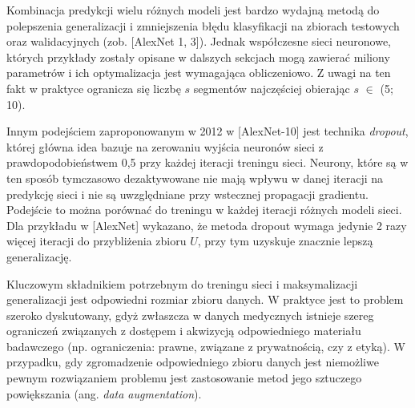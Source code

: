 Kombinacja predykcji wielu różnych modeli jest bardzo wydajną metodą do polepszenia generalizacji i zmniejszenia błędu klasyfikacji na zbiorach testowych oraz walidacyjnych (zob. [AlexNet 1, 3]). Jednak współczesne sieci neuronowe, których przykłady zostały opisane w dalszych sekcjach mogą zawierać miliony parametrów i ich optymalizacja jest wymagająca obliczeniowo. Z uwagi na ten fakt w praktyce ogranicza się liczbę $s$ segmentów najczęściej obierając $s$ $\in$ (5; 10).

Innym podejściem zaproponowanym w 2012 w [AlexNet-10] jest technika \textit{dropout}, której główna idea bazuje na zerowaniu wyjścia neuronów sieci z prawdopodobieństwem 0,5 przy każdej iteracji treningu sieci. Neurony, które są w ten sposób tymczasowo dezaktywowane nie mają wpływu w danej iteracji na predykcję sieci i nie są uwzględniane przy wstecznej propagacji gradientu. Podejście to można porównać do treningu w każdej iteracji różnych modeli sieci. Dla przykładu w [AlexNet] wykazano, że metoda dropout wymaga jedynie 2 razy więcej iteracji do przybliżenia zbioru $U$, przy tym uzyskuje znacznie lepszą generalizację. 

Kluczowym składnikiem potrzebnym do treningu sieci i maksymalizacji generalizacji jest odpowiedni rozmiar zbioru danych. W praktyce jest to problem szeroko dyskutowany, gdyż zwłaszcza w danych medycznych istnieje szereg ograniczeń związanych z dostępem i akwizycją odpowiedniego materiału badawczego (np. ograniczenia: prawne, związane z prywatnością, czy z etyką). W przypadku, gdy zgromadzenie odpowiedniego zbioru danych jest niemożliwe pewnym rozwiązaniem problemu jest zastosowanie metod jego sztuczego powiększania (ang. \textit{data augmentation}).

